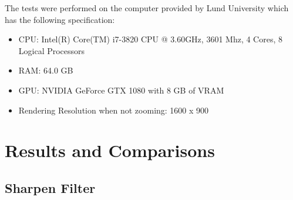 \documentclass{cslthse-msc}
\begin{document}
The tests were performed on the computer provided by Lund University which has the following specification:
\begin{itemize}
\setlength\itemsep{1em}
\item CPU: Intel(R) Core(TM) i7-3820 CPU @ 3.60GHz, 3601 Mhz, 4 Cores, 8 Logical Processors
\item RAM: 64.0 GB	
\item GPU: NVIDIA GeForce GTX 1080 with 8 GB of VRAM
\item Rendering Resolution when not zooming: 1600 x 900
\end{itemize}

\section{Results and Comparisons}

\subsection{Sharpen Filter}
\end{document}

